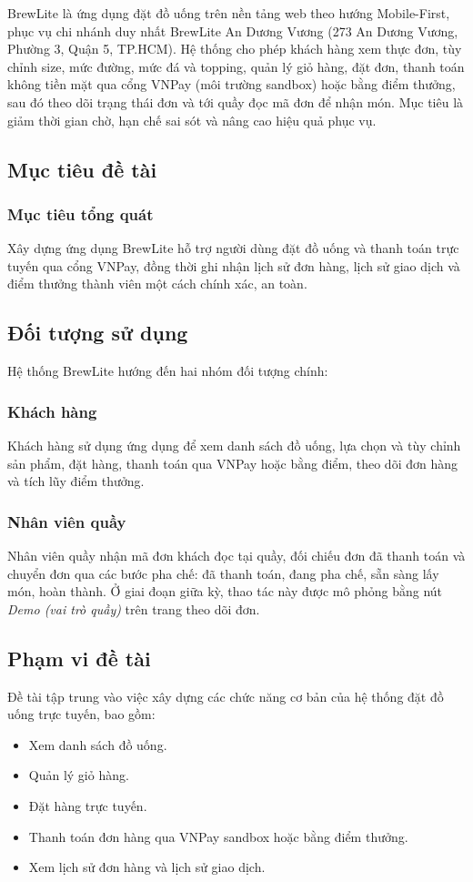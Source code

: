 \documentclass[12pt,a4paper]{article}
\begin{document}
BrewLite là ứng dụng đặt đồ uống trên nền tảng web theo hướng Mobile-First, phục vụ chi nhánh duy nhất BrewLite An Dương Vương (273 An Dương Vương, Phường 3, Quận 5, TP.HCM). Hệ thống cho phép khách hàng xem thực đơn, tùy chỉnh size, mức đường, mức đá và topping, quản lý giỏ hàng, đặt đơn, thanh toán không tiền mặt qua cổng VNPay (môi trường sandbox) hoặc bằng điểm thưởng, sau đó theo dõi trạng thái đơn và tới quầy đọc mã đơn để nhận món. Mục tiêu là giảm thời gian chờ, hạn chế sai sót và nâng cao hiệu quả phục vụ.

\subsection{Mục tiêu đề tài}
\subsubsection{Mục tiêu tổng quát}
Xây dựng ứng dụng BrewLite hỗ trợ người dùng đặt đồ uống và thanh toán trực tuyến qua cổng VNPay, đồng thời ghi nhận lịch sử đơn hàng, lịch sử giao dịch và điểm thưởng thành viên một cách chính xác, an toàn.

\subsection{Đối tượng sử dụng}
Hệ thống BrewLite hướng đến hai nhóm đối tượng chính:

\subsubsection{Khách hàng}
Khách hàng sử dụng ứng dụng để xem danh sách đồ uống, lựa chọn và tùy chỉnh sản phẩm, đặt hàng, thanh toán qua VNPay hoặc bằng điểm, theo dõi đơn hàng và tích lũy điểm thưởng.

\subsubsection{Nhân viên quầy}
Nhân viên quầy nhận mã đơn khách đọc tại quầy, đối chiếu đơn đã thanh toán và chuyển đơn qua các bước pha chế: đã thanh toán, đang pha chế, sẵn sàng lấy món, hoàn thành. Ở giai đoạn giữa kỳ, thao tác này được mô phỏng bằng nút \textit{Demo (vai trò quầy)} trên trang theo dõi đơn.

\subsection{Phạm vi đề tài}
Đề tài tập trung vào việc xây dựng các chức năng cơ bản của hệ thống đặt đồ uống trực tuyến, bao gồm:
\begin{itemize}
  \item Xem danh sách đồ uống.
  \item Quản lý giỏ hàng.
  \item Đặt hàng trực tuyến.
  \item Thanh toán đơn hàng qua VNPay sandbox hoặc bằng điểm thưởng.
  \item Xem lịch sử đơn hàng và lịch sử giao dịch.
\end{itemize}
\end{document}
